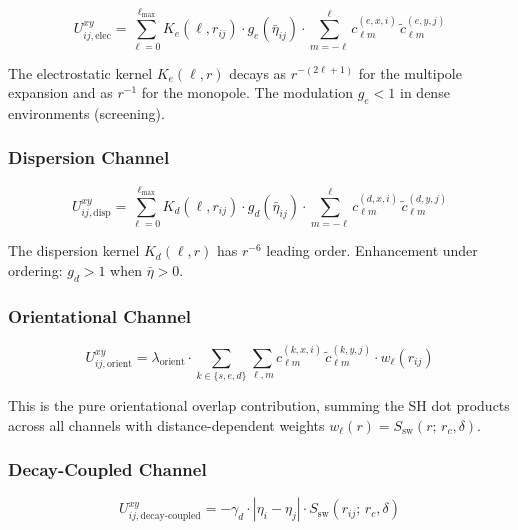 \documentclass[11pt, a4paper, oneside]{article}
\begin{document}
\begin{equation}
U_{ij,\mathrm{elec}}^{xy}
= \sum_{\ell=0}^{\ell_{\max}}
  K_e(\ell, r_{ij})\cdot
  g_e(\bar\eta_{ij})\cdot
  \sum_{m=-\ell}^{\ell} c_{\ell m}^{(e,x,i)}\,\tilde{c}_{\ell m}^{(e,y,j)}
\label{eq:Uij_elec}
\end{equation}

The electrostatic kernel $K_e(\ell, r)$ decays as $r^{-(2\ell+1)}$
for the multipole expansion and as $r^{-1}$ for the monopole.
The modulation $g_e < 1$ in dense environments (screening).

\subsubsection{Dispersion Channel}

\begin{equation}
U_{ij,\mathrm{disp}}^{xy}
= \sum_{\ell=0}^{\ell_{\max}}
  K_d(\ell, r_{ij})\cdot
  g_d(\bar\eta_{ij})\cdot
  \sum_{m=-\ell}^{\ell} c_{\ell m}^{(d,x,i)}\,\tilde{c}_{\ell m}^{(d,y,j)}
\label{eq:Uij_disp}
\end{equation}

The dispersion kernel $K_d(\ell, r)$ has $r^{-6}$ leading order.
Enhancement under ordering: $g_d > 1$ when $\bar\eta > 0$.

\subsubsection{Orientational Channel}

\begin{equation}
U_{ij,\mathrm{orient}}^{xy}
= \lambda_{\mathrm{orient}}\cdot
  \sum_{k\in\{s,e,d\}}
  \sum_{\ell,m} c_{\ell m}^{(k,x,i)}\,\tilde{c}_{\ell m}^{(k,y,j)}
  \cdot w_\ell(r_{ij})
\label{eq:Uij_orient}
\end{equation}

This is the pure orientational overlap contribution, summing the SH
dot products across all channels with distance-dependent weights
$w_\ell(r) = S_{\mathrm{sw}}(r;\, r_c, \delta)$.

\subsubsection{Decay-Coupled Channel}

\begin{equation}
U_{ij,\mathrm{decay\text{-}coupled}}^{xy}
= -\gamma_d\cdot |\eta_i - \eta_j|\cdot S_{\mathrm{sw}}(r_{ij};\, r_c, \delta)
\label{eq:Uij_decay}
\end{equation}
\end{document}
